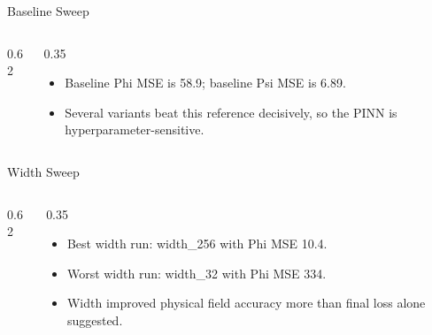 \documentclass[aspectratio=169,professionalfonts]{beamer}
\begin{document}
\begin{frame}[t]{Baseline Sweep}
\begin{columns}[T,onlytextwidth]
\begin{column}{0.62\textwidth}
\scriptsize
{}
\end{column}
\begin{column}{0.35\textwidth}
\begin{itemize}
  \item Baseline Phi MSE is 58.9; baseline Psi MSE is 6.89.
  \item Several variants beat this reference decisively, so the PINN is hyperparameter-sensitive.
\end{itemize}
\end{column}
\end{columns}
\end{frame}

\begin{frame}[t]{Width Sweep}
\begin{columns}[T,onlytextwidth]
\begin{column}{0.62\textwidth}
\scriptsize
{}
\end{column}
\begin{column}{0.35\textwidth}
\begin{itemize}
  \item Best width run: width\_256 with Phi MSE 10.4.
  \item Worst width run: width\_32 with Phi MSE 334.
  \item Width improved physical field accuracy more than final loss alone suggested.
\end{itemize}
\end{column}
\end{columns}
\end{frame}
\end{document}
